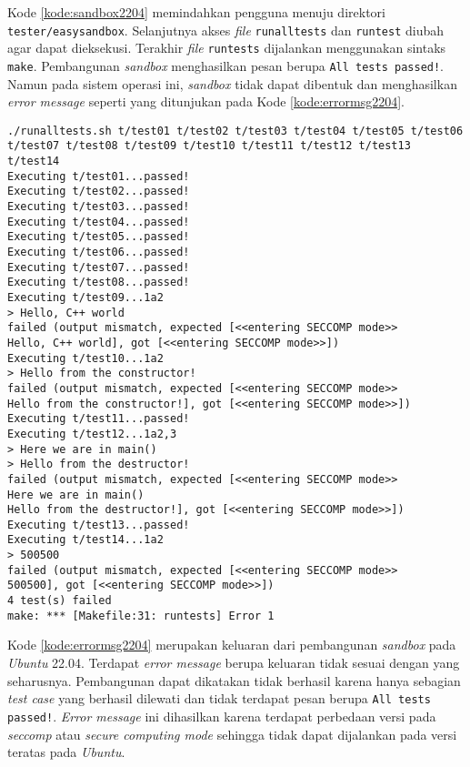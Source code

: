 Kode \ref{kode:sandbox2204} memindahkan pengguna menuju direktori \texttt{tester/easysandbox}. Selanjutnya akses \textit{file} \texttt{runalltests} dan \texttt{runtest} diubah agar dapat dieksekusi. Terakhir \textit{file} \texttt{runtests} dijalankan menggunakan sintaks \texttt{make}. Pembangunan \textit{sandbox} menghasilkan pesan berupa \texttt{All tests passed!}. Namun pada sistem operasi ini, \textit{sandbox} tidak dapat dibentuk dan menghasilkan \textit{error message} seperti yang ditunjukan pada Kode \ref{kode:errormsg2204}.
\begin{lstlisting}[caption=\textit{Error message} pembangunan \textit{sandbox} pada \textit{Ubuntu} 22.04, label=kode:errormsg2204]
./runalltests.sh t/test01 t/test02 t/test03 t/test04 t/test05 t/test06 t/test07 t/test08 t/test09 t/test10 t/test11 t/test12 t/test13 t/test14
Executing t/test01...passed!
Executing t/test02...passed!
Executing t/test03...passed!
Executing t/test04...passed!
Executing t/test05...passed!
Executing t/test06...passed!
Executing t/test07...passed!
Executing t/test08...passed!
Executing t/test09...1a2
> Hello, C++ world
failed (output mismatch, expected [<<entering SECCOMP mode>>
Hello, C++ world], got [<<entering SECCOMP mode>>])
Executing t/test10...1a2
> Hello from the constructor!
failed (output mismatch, expected [<<entering SECCOMP mode>>
Hello from the constructor!], got [<<entering SECCOMP mode>>])
Executing t/test11...passed!
Executing t/test12...1a2,3
> Here we are in main()
> Hello from the destructor!
failed (output mismatch, expected [<<entering SECCOMP mode>>
Here we are in main()
Hello from the destructor!], got [<<entering SECCOMP mode>>])
Executing t/test13...passed!
Executing t/test14...1a2
> 500500
failed (output mismatch, expected [<<entering SECCOMP mode>>
500500], got [<<entering SECCOMP mode>>])
4 test(s) failed
make: *** [Makefile:31: runtests] Error 1
\end{lstlisting}
Kode \ref{kode:errormsg2204} merupakan keluaran dari pembangunan \textit{sandbox} pada \textit{Ubuntu} 22.04. Terdapat \textit{error message} berupa keluaran tidak sesuai dengan yang seharusnya. Pembangunan dapat dikatakan tidak berhasil karena hanya sebagian \textit{test case} yang berhasil dilewati dan tidak terdapat pesan berupa \texttt{All tests passed!}. \textit{Error message} ini dihasilkan karena terdapat perbedaan versi pada \textit{seccomp} atau \textit{secure computing mode} sehingga tidak dapat dijalankan pada versi teratas pada \textit{Ubuntu}.

